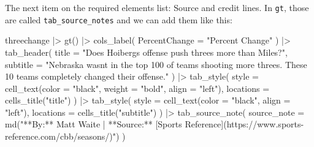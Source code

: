 \documentclass[
  letterpaper,
  DIV=11,
  numbers=noendperiod]{scrreprt}
\newenvironment{Shaded}{\begin{snugshade}}{\end{snugshade}}
\newcommand{\AttributeTok}[1]{\textcolor[rgb]{0.40,0.45,0.13}{#1}}
\newcommand{\FunctionTok}[1]{\textcolor[rgb]{0.28,0.35,0.67}{#1}}
\newcommand{\NormalTok}[1]{\textcolor[rgb]{0.00,0.23,0.31}{#1}}
\newcommand{\SpecialCharTok}[1]{\textcolor[rgb]{0.37,0.37,0.37}{#1}}
\newcommand{\StringTok}[1]{\textcolor[rgb]{0.13,0.47,0.30}{#1}}
\begin{document}
The next item on the required elements list: Source and credit lines. In
\texttt{gt}, those are called \texttt{tab\_source\_notes} and we can add
them like this:

\begin{Shaded}
\begin{Highlighting}[]
\NormalTok{threechange }\SpecialCharTok{|\textgreater{}} 
  \FunctionTok{gt}\NormalTok{() }\SpecialCharTok{|\textgreater{}} 
  \FunctionTok{cols\_label}\NormalTok{(}
    \AttributeTok{PercentChange =} \StringTok{"Percent Change"}
\NormalTok{  ) }\SpecialCharTok{|\textgreater{}}
  \FunctionTok{tab\_header}\NormalTok{(}
    \AttributeTok{title =} \StringTok{"Does Hoiberg\textquotesingle{}s offense push threes more than Miles?"}\NormalTok{,}
    \AttributeTok{subtitle =} \StringTok{"Nebraska wasn\textquotesingle{}t in the top 100 of teams shooting more threes. These 10 teams completely changed their offense."}
\NormalTok{  ) }\SpecialCharTok{|\textgreater{}} \FunctionTok{tab\_style}\NormalTok{(}
    \AttributeTok{style =} \FunctionTok{cell\_text}\NormalTok{(}\AttributeTok{color =} \StringTok{"black"}\NormalTok{, }\AttributeTok{weight =} \StringTok{"bold"}\NormalTok{, }\AttributeTok{align =} \StringTok{"left"}\NormalTok{),}
    \AttributeTok{locations =} \FunctionTok{cells\_title}\NormalTok{(}\StringTok{"title"}\NormalTok{)}
\NormalTok{  ) }\SpecialCharTok{|\textgreater{}} \FunctionTok{tab\_style}\NormalTok{(}
    \AttributeTok{style =} \FunctionTok{cell\_text}\NormalTok{(}\AttributeTok{color =} \StringTok{"black"}\NormalTok{, }\AttributeTok{align =} \StringTok{"left"}\NormalTok{),}
    \AttributeTok{locations =} \FunctionTok{cells\_title}\NormalTok{(}\StringTok{"subtitle"}\NormalTok{)}
\NormalTok{  ) }\SpecialCharTok{|\textgreater{}}
  \FunctionTok{tab\_source\_note}\NormalTok{(}
    \AttributeTok{source\_note =} \FunctionTok{md}\NormalTok{(}\StringTok{"**By:** Matt Waite  |  **Source:** [Sports Reference](https://www.sports{-}reference.com/cbb/seasons/)"}\NormalTok{)}
\NormalTok{  )}
\end{Highlighting}
\end{Shaded}
\end{document}
